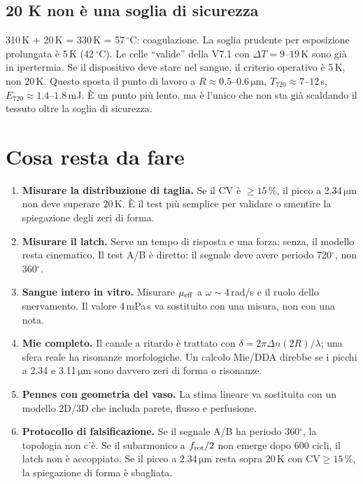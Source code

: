 \documentclass[11pt,a4paper]{article}
\providecommand{\micro}{}
\renewcommand{\micro}{\ensuremath{\mathrm{\mu}}}
\begin{document}
\subsection{20 K non è una soglia di sicurezza}

310\,K + 20\,K = 330\,K = 57\,$^\circ$C: coagulazione. La soglia prudente
per esposizione prolungata è 5\,K (42\,$^\circ$C). Le celle ``valide'' della
V7.1 con $\Delta T=9$--$19$\,K sono già in ipertermia. Se il dispositivo
deve stare nel sangue, il criterio operativo è 5\,K, non 20\,K. Questo
sposta il punto di lavoro a $R\approx0.5$--$0.6\,\micro$m,
$T_{720}\approx7$--$12$\,s, $E_{720}\approx1.4$--$1.8$\,mJ. È un punto più
lento, ma è l'unico che non sta già scaldando il tessuto oltre la soglia di
sicurezza.

\section{Cosa resta da fare}
\label{sec:resta}

\begin{enumerate}\itemsep2pt
\item \textbf{Misurare la distribuzione di taglia.} Se il CV è $\ge15\,\%$,
il picco a 2.34\,$\micro$m non deve superare 20\,K. È il test più semplice
per validare o smentire la spiegazione degli zeri di forma.
\item \textbf{Misurare il latch.} Serve un tempo di risposta e una forza;
senza, il modello resta cinematico. Il test A/B è diretto: il segnale deve
avere periodo 720$^\circ$, non 360$^\circ$.
\item \textbf{Sangue intero in vitro.} Misurare $\mu_{\rm eff}$ a
$\omega\sim4$\,rad/s e il ruolo dello snervamento. Il valore 4\,mPa\,s va
sostituito con una misura, non con una nota.
\item \textbf{Mie completo.} Il canale a ritardo è trattato con
$\delta=2\pi\Delta n(2R)/\lambda$; una sfera reale ha risonanze
morfologiche. Un calcolo Mie/DDA direbbe se i picchi a 2.34 e
3.11\,$\micro$m sono davvero zeri di forma o risonanze.
\item \textbf{Pennes con geometria del vaso.} La stima lineare va sostituita
con un modello 2D/3D che includa parete, flusso e perfusione.
\item \textbf{Protocollo di falsificazione.} Se il segnale A/B ha periodo
360$^\circ$, la topologia non c'è. Se il subarmonico a $f_{\rm rot}/2$ non
emerge dopo 600 cicli, il latch non è accoppiato. Se il picco a
2.34\,$\micro$m resta sopra 20\,K con CV$\ge15\,\%$, la spiegazione di forma
è sbagliata.
\end{enumerate}
\end{document}
